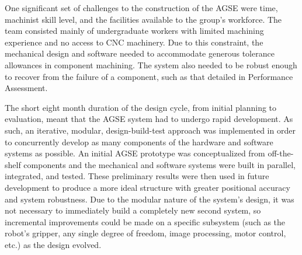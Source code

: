 One significant set of challenges to the construction of the AGSE were time, machinist skill level, and the facilities available to the group's workforce. The team consisted mainly of undergraduate workers with limited machining experience and no access to CNC machinery.  Due to this constraint, the mechanical design and software needed to accommodate generous tolerance allowances in component machining. The system also needed to be robust enough to recover from the failure of a component, such as that detailed in Performance Assessment.

The short eight month duration of the design cycle, from initial planning to evaluation, meant that the AGSE system had to undergo rapid development.  As such, an iterative, modular, design-build-test approach was implemented in order to concurrently develop as many components of the hardware and software systems as possible. An initial AGSE prototype was conceptualized from off-the-shelf components and the mechanical and software systems were built in parallel, integrated, and tested. These preliminary results were then used in future development to produce a more ideal structure with greater positional accuracy and system robustness.  Due to the modular nature of the system's design, it was not necessary to immediately build a completely new second system, so incremental improvements could be made on a specific subsystem (such as the robot's gripper, any single degree of freedom, image processing, motor control, etc.) as the design evolved.



